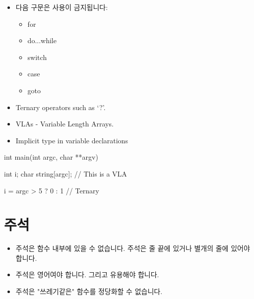 \documentclass{42-ko}
\begin{document}
        \begin{itemize}

            \item 다음 구문은 사용이 금지됩니다:

                \begin{itemize}

                    \item for
                    \item do...while
                    \item switch
                    \item case
                    \item goto

                \end{itemize}

            \item Ternary operators such as `?'.

            \item VLAs - Variable Length Arrays.

            \item Implicit type in variable declarations

        \end{itemize}
        \begin{42ccode}
    int main(int argc, char **argv)
    {
        int     i;
        char    string[argc]; // This is a VLA

        i = argc > 5 ? 0 : 1 // Ternary
    }
        \end{42ccode}
        \newpage

    \section{주석}

        \begin{itemize}

            \item 주석은 함수 내부에 있을 수 없습니다. 
				주석은 줄 끝에 있거나 별개의 줄에 있어야 합니다.

            \item 주석은 영어여야 합니다. 그리고 유용해야 합니다.

            \item 주석은 "쓰레기같은" 함수를 정당화할 수 없습니다.

        \end{itemize}
        \newpage
\end{document}
